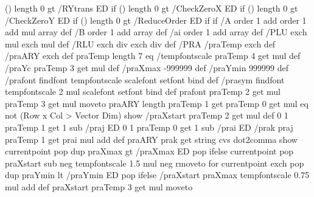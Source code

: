 {{       (\psk@RYtrans) length 0 gt { {\psk@RYtrans\space} /RYtrans ED } if
       (\psk@CheckZeroX) length 0 gt { {\psk@CheckZeroX\space} /CheckZeroX ED } if
       (\psk@CheckZeroY) length 0 gt { {\psk@CheckZeroY\space} /CheckZeroY ED } if
       (\psk@ReduceOrder) length 0 gt { {\psk@ReduceOrder\space} /ReduceOrder ED } if } if %
  /A order 1 add order 1 add mul array def
  /B order 1 add array def
  /ai order 1 add array def
  /PLU {exch \pst@number\psxunit\space mul exch \pst@number\psyunit\space mul } def
  /RLU {exch \pst@number\psxunit\space div exch \pst@number\psyunit\space div } def
  /PRA { %
         /praTemp exch def /praARY exch def
         praTemp length 7 eq {%
         /tempfontscale \psk@fontscale praTemp 4 get mul def
         /praYc praTemp 3 get \pst@number\psyunit\space mul def
         /praXmax -999999 def
         /praYmin 999999 def
         /prafont {\psk@PSfont\space findfont tempfontscale scalefont setfont} bind def
         /prasym { \psk@symbolFont\space findfont tempfontscale 2 mul scalefont setfont} bind def
         prafont
         praTemp 2 get \pst@number\psxunit\space mul praTemp 3 get \pst@number\psyunit\space mul moveto
         praARY length praTemp 1 get praTemp 0 get mul eq not { (Row x Col > Vector Dim) show }{%
         /praXstart praTemp 2 get \pst@number\psxunit\space mul def
         0 1 praTemp 1 get 1 sub {/praj ED
         0 1 praTemp 0 get 1 sub {/prai ED /prak praj praTemp 1 get prai mul add def
         praARY prak get \psk@valuewidth string cvs \ifPst@comma\space dot2comma \fi show
         currentpoint pop dup praXmax gt { /praXmax ED }{ pop } ifelse
         currentpoint pop praXstart sub neg tempfontscale 1.5 mul neg rmoveto
         } for
         currentpoint exch pop dup praYmin lt { /praYmin ED }{ pop } ifelse
         /praXstart praXmax tempfontscale 0.75 mul add def
         praXstart praTemp 3 get \pst@number\psyunit\space mul moveto
}}}}}
